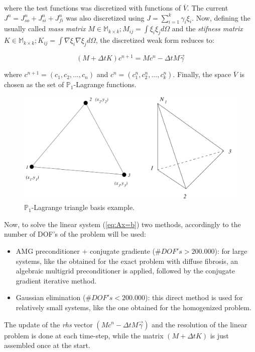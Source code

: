 where the test functions was discretized with functions of $\overline{V}$. The current $J^n = J_{so}^n + J_{si}^n + J_{fi}^n$ was also discretized using $J = \sum_{i=1}^k \gamma_i \xi_i$. Now, defining the usually called \textsl{mass matrix}  $M \in \mathbb{M}_{k \times k}; M_{ij} = \int \xi_i \xi_j d \Omega $ and the \textsl{stifness matrix} $K \in \mathbb{M}_{k \times k}; K_{ij} = \int \nabla \xi_i  \nabla \xi_j d \Omega$, the discretized weak form reduces to:

\begin{equation}
(M + \Delta t K) c^{n+1} = M c^n - \Delta t M \vec{\gamma} \label{eq:Ax=b}
\end{equation}

where $c^{n+1} = (c_1, c_2, ..., c_n)$ and $c^n = (c_1^n, c_2^n, ..., c_k^n)$. Finally, the space $\overline{V}$ is chosen as the set of $\mathbb{P}_1$-Lagrange functions.

\begin{figure}[H]
\centering
\includegraphics[height = 5 cm]{fig/fem_p1_shape_functions}
\caption{$\mathbb{P}_1$-Lagrange triangle basis example.}
\end{figure}

Now, to solve the linear system (\ref{eq:Ax=b}) two methods, accordingly to the number of DOF's of the problem will be used:

\begin{itemize}
\item AMG preconditioner $+$ conjugate gradiente ($\# DOF's > 200.000$): for large systems, like the obtained for the exact problem with diffuse fibrosis, an algebraic multigrid preconditioner is applied, followed by the conjugate gradient iterative method.
\item Gaussian elimination ($\# DOF's < 200.000$): this direct method is used for relatively small systems, like the one obtained for the homogenized problem.
\end{itemize}

The update of the \textsl{rhs} vector $(M c^n - \Delta t M \vec{\gamma})$ and the resolution of the linear problem is done at each time-step, while the matrix $(M + \Delta t K)$ is just assembled once at the start.

